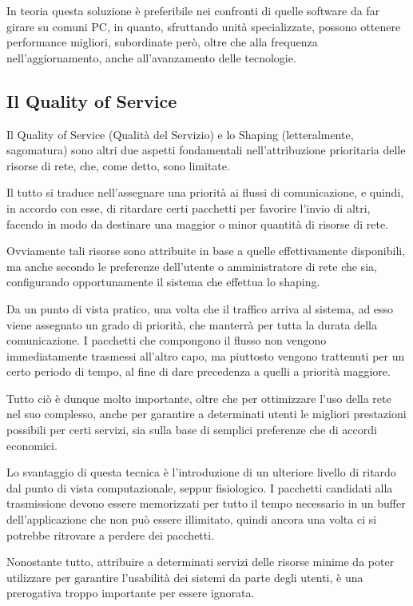 In teoria questa soluzione è preferibile nei confronti di quelle software da far girare su comuni PC, in quanto, sfruttando unità specializzate, possono ottenere performance migliori, subordinate però, oltre che alla frequenza nell'aggiornamento, anche all'avanzamento delle tecnologie.

\subsection{Il Quality of Service}

Il Quality of Service \cite{qos} (Qualità del Servizio) e lo Shaping \cite{ts} (letteralmente, sagomatura) sono altri due aspetti fondamentali nell'attribuzione prioritaria delle risorse di rete, che, come detto, sono limitate.

Il tutto si traduce nell'assegnare una priorità ai flussi di comunicazione, e quindi, in accordo con esse, di ritardare certi pacchetti per favorire l'invio di altri, facendo in modo da destinare una maggior o minor quantità di risorse di rete.

Ovviamente tali risorse sono attribuite in base a quelle effettivamente disponibili, ma anche secondo le preferenze dell'utente o amministratore di rete che sia, configurando opportunamente il sistema che effettua lo shaping.

\clearpage
Da un punto di vista pratico, una volta che il traffico arriva al sistema, ad esso viene assegnato un grado di priorità, che manterrà per tutta la durata della comunicazione. I pacchetti che compongono il flusso non vengono immediatamente trasmessi all'altro capo, ma piuttosto vengono trattenuti per un certo periodo di tempo, al fine di dare precedenza a quelli a priorità maggiore.

Tutto ciò è dunque molto importante, oltre che per ottimizzare l'uso della rete nel suo complesso, anche per garantire a determinati utenti le migliori prestazioni possibili per certi servizi, sia sulla base di semplici preferenze che di accordi economici.

Lo svantaggio di questa tecnica è l'introduzione di un ulteriore livello di ritardo dal punto di vista computazionale, seppur fisiologico. I pacchetti candidati alla trasmissione devono essere memorizzati per tutto il tempo necessario in un buffer dell'applicazione che non può essere illimitato, quindi ancora una volta ci si potrebbe ritrovare a perdere dei pacchetti.

Nonostante tutto, attribuire a determinati servizi delle risorse minime da poter utilizzare per garantire l'usabilità dei sistemi da parte degli utenti, è una prerogativa troppo importante per essere ignorata.

